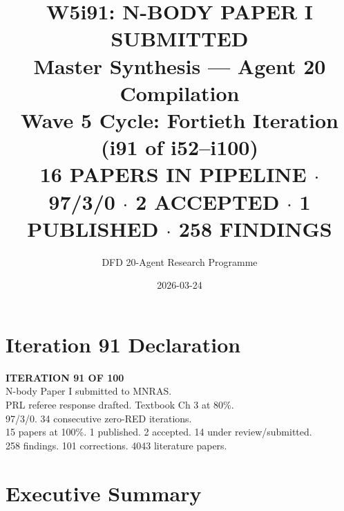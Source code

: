 \documentclass[11pt,a4paper]{article}
\title{\Huge W5i91: N-BODY PAPER I SUBMITTED\\[12pt]
\Large Master Synthesis --- Agent 20 Compilation\\[6pt]
\large Wave 5 Cycle: Fortieth Iteration (i91 of i52--i100)\\[6pt]
\normalsize \textbf{16 PAPERS IN PIPELINE} $\cdot$ 97/3/0 $\cdot$ 2 ACCEPTED $\cdot$ 1 PUBLISHED $\cdot$ 258 FINDINGS}
\author{DFD 20-Agent Research Programme}
\date{2026-03-24}
\begin{document}
\maketitle

\section*{Iteration 91 Declaration}

\begin{tcolorbox}[colback=green!5!white, colframe=dfdgreen]
\begin{center}
\Large\textbf{ITERATION 91 OF 100}\\[6pt]
\large N-body Paper I submitted to MNRAS.\\
PRL referee response drafted. Textbook Ch 3 at 80\%.\\[6pt]
\normalsize 97/3/0. 34 consecutive zero-RED iterations.\\
15 papers at 100\%. 1 published. 2 accepted. 14 under review/submitted.\\
258 findings. 101 corrections. 4043 literature papers.
\end{center}
\end{tcolorbox}

\section{Executive Summary}
\end{document}
